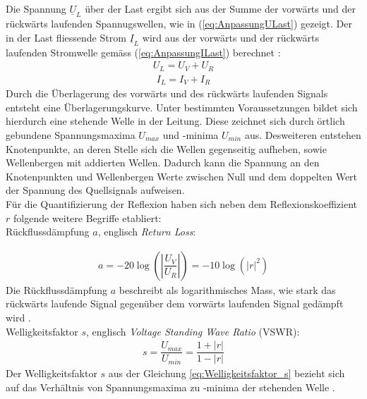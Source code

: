 Die Spannung $\underline{U}_L$ über der Last ergibt sich aus der Summe der vorwärts und der rückwärts laufenden Spannugswellen, wie  in (\ref{eq:AnpassungULast}) gezeigt. Der in der Last fliessende Strom $\underline{I}_L$ wird aus der vorwärts und der rückwärts laufenden Stromwelle gemäss (\ref{eq:AnpassungILast}) berechnet \cite{Tekom}:
\begin{eqnarray}\label{eq:AnpassungULast}
U_L =U_V +U_R
\end{eqnarray}
\begin{eqnarray}\label{eq:AnpassungILast}
I_L = I_V + I_R
\end{eqnarray}
Durch die Überlagerung des vorwärts und des rückwärts laufenden Signals entsteht eine Überlagerungskurve. Unter bestimmten Voraussetzungen bildet sich hierdurch eine stehende Welle in der Leitung. Diese zeichnet sich durch örtlich gebundene Spannungsmaxima $U_{max}$ und -minima $U_{min}$ aus. Desweiteren entstehen Knotenpunkte, an deren Stelle sich die Wellen gegenseitig aufheben, sowie Wellenbergen mit addierten Wellen. Dadurch kann die Spannung an den Knotenpunkten und Wellenbergen Werte zwischen Null und dem doppelten Wert der Spannung des Quellsignals aufweisen.\\

Für die Quantifizierung der Reflexion haben sich neben dem Reflexionskoeffizient $r$ folgende weitere Begriffe etabliert:\\

Rückflussdämpfung $a$, englisch \textit{Return Loss}:

\begin{eqnarray}\label{eq:Ruckflussdämpfung_a}
a=-20\log\left(\left| \dfrac{U_V}{U_R}\right| \right)=-10\log(|r|^{2})
\end{eqnarray}
Die Rückflussdämpfung $a$ beschreibt als logarithmisches Mass, wie stark das rückwärts laufende Signal gegenüber dem vorwärts laufenden Signal gedämpft wird \cite{Tekom}.\\


Welligkeitsfaktor $s$, englisch \textit{Voltage Standing Wave Ratio} (VSWR):
\begin{eqnarray}\label{eq:Welligkeitsfaktor_s}
s=\dfrac{U_{max}}{U_{min}}=\dfrac{1+|r|}{1-|r|}
\end{eqnarray}
Der Welligkeitsfaktor $s$ aus der Gleichung \ref{eq:Welligkeitsfaktor_s} bezieht sich auf das Verhältnis von Spannungsmaxima zu -minima der stehenden Welle \cite{Tekom}.\\


